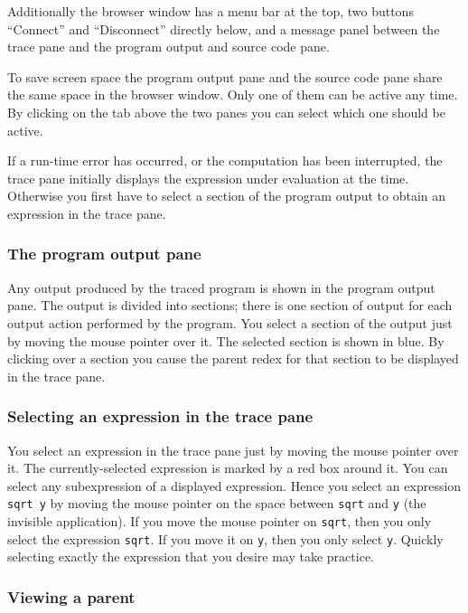 \documentclass[12pt]{article}
\begin{document}
Additionally the browser window has a menu bar at the top, two buttons ``Connect'' and ``Disconnect'' directly below, and a message panel between the trace pane and the program output and source code pane.

To save screen space the program output pane and the source code pane share the same space in the browser window. Only one of them can be active any time. By clicking on the tab above the two panes you can select which one should be active.

If a run-time error has occurred, or the computation has been interrupted,
the trace pane initially displays the expression under
evaluation at the time. Otherwise you first have to select a section of the program output to obtain an expression in the trace pane.

\subsubsection{The program output pane}

Any output produced by the traced program is shown in the program output pane.
The output is divided into sections; there is one section of output for each output action performed by the program. You select a section of the output just by moving the mouse pointer over it. The selected section is shown in blue.
By clicking over a section you cause the parent redex for that section to be displayed in the trace pane. 

\subsubsection{Selecting an expression in the trace pane}

You select an expression in the trace pane just by moving the mouse pointer over it. The currently-selected expression is marked by a red box around it. You can select any subexpression of a displayed expression. Hence you select an expression \texttt{sqrt y} by moving the mouse pointer on the space between \texttt{sqrt} and \texttt{y} (the invisible application). If you move the mouse pointer on \texttt{sqrt}, then you only select the expression \texttt{sqrt}. If you move it on \texttt{y}, then you only select \texttt{y}.
Quickly selecting exactly the expression that you desire may take practice.

\subsubsection{Viewing a parent}
\end{document}
